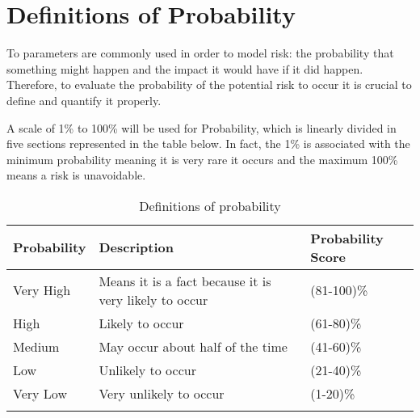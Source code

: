 \section{Definitions of Probability}

To parameters are commonly used in order to model risk: the probability that something might happen and the impact it would have if it did happen. Therefore, to evaluate the probability of the potential risk to occur it is crucial to define and quantify it properly. 

A scale of 1\% to 100\% will be used for Probability, which is linearly divided in five sections represented in the table below. In fact, the 1\% is associated with the minimum probability meaning it is very rare it occurs and the maximum 100\% means a risk is unavoidable. 

\begin{longtable}[H]{l >{\raggedright\arraybackslash}p{7.8cm} p{4cm}}
	
	\toprule[2pt]
	
	\textbf{Probability} &  \textbf{Description}  & \textbf{Probability Score} \\
	
	\midrule [1.5pt]
	\endhead
	
	Very High & Means it is a fact because it is very likely to occur & (81-100)\%
	\vspace{0.2cm} \\
	
	\midrule
	
	High & Likely to occur & (61-80)\%
	\vspace{0.2cm} \\
	
	\midrule
	
	Medium & May occur about half of the time & (41-60)\% 
	\vspace{0.2cm} \\

	\midrule

	Low & Unlikely to occur & (21-40)\% 
	\vspace{0.2cm} \\

	\midrule

	Very Low & Very unlikely to occur & (1-20)\% 
	\vspace{0.2cm} \\
		
	\bottomrule[2pt]
	
	\caption{Definitions of probability}

\end{longtable}
